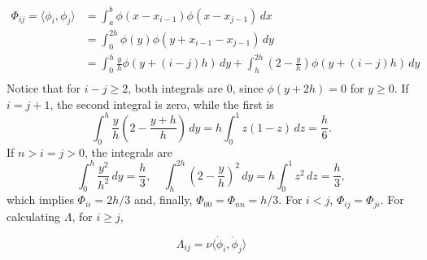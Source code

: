 \documentclass[12pt]{article}
\newcommand{\inner}[2]{\langle{} #1, #2 \rangle{}}
\theoremstyle{definition}
\begin{document}
\[
\begin{split}
    \Phi_{ij} = \inner{\phi_i}{\phi_j} &= \int_a^b \phi(x-x_{i-1})\phi(x-x_{j-1}) \, dx \\
    &= \int_{0}^{2h} \phi(y)\phi(y+x_{i-1}-x_{j-1}) \, dy \\
    &= \int_{0}^{h} \frac{y}{h}\phi(y+(i-j)h) \, dy + \int_{h}^{2h} \left(2-\frac{y}{h}\right)\phi(y+(i-j)h) \, dy \\
\end{split}
\]
Notice that for $i-j\ge 2$, both integrals are $0$, since $\phi(y+2h) = 0$ for $y \ge 0$.
If $i=j+1$, the second integral is zero, while the first is 
\[
\int_0^h \frac{y}{h}\left(2-\frac{y+h}{h}\right) \, dy = h\int_0^1 z\left(1-z\right) \, dz = \frac{h}{6}.
\]
If $n > i=j > 0$, the integrals are 
\[
\int_{0}^{h} \frac{y^2}{h^2}\, dy = \frac{h}{3},  \quad \int_{h}^{2h} {\left(2-\frac{y}{h}\right)}^2 \, dy =  h\int_{0}^{1} z^2 \, dz = \frac{h}{3},
\]
which implies $\Phi_{ii} = 2h/3$ and, finally, $\Phi_{00} = \Phi_{nn} = h/3$. 
For $i < j$, $\Phi_{ij} = \Phi_{ji}$.
For calculating $\Lambda$, for $i \ge j$,

\[
\Lambda_{ij} = \nu \inner{\dot{\phi}_i}{\dot{\phi}_j}
\]




\end{document}
